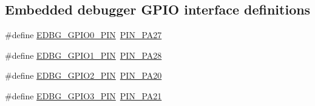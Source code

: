 \subsection*{Embedded debugger G\+P\+IO interface definitions}
\begin{DoxyCompactItemize}
\item 
\#define \mbox{\hyperlink{group__samd21__xplained__pro__features__group_gab52250c9a7d51e3c63694293bf95eb6e}{E\+D\+B\+G\+\_\+\+G\+P\+I\+O0\+\_\+\+P\+IN}}~\mbox{\hyperlink{pio_2samd21j18a_8h_a3794cc9242203d349103ba1249e5d587}{P\+I\+N\+\_\+\+P\+A27}}
\item 
\#define \mbox{\hyperlink{group__samd21__xplained__pro__features__group_ga3c61dc36b629d98962cdc489d7631607}{E\+D\+B\+G\+\_\+\+G\+P\+I\+O1\+\_\+\+P\+IN}}~\mbox{\hyperlink{pio_2samd21j18a_8h_af75c65abdba3e908699ed3c1c21f1148}{P\+I\+N\+\_\+\+P\+A28}}
\item 
\#define \mbox{\hyperlink{group__samd21__xplained__pro__features__group_gafbf7f6c9548bd68ba68ab103a7bdb2dd}{E\+D\+B\+G\+\_\+\+G\+P\+I\+O2\+\_\+\+P\+IN}}~\mbox{\hyperlink{pio_2samd21j18a_8h_a00c77a5c19a99cee2402fc83b04c02d5}{P\+I\+N\+\_\+\+P\+A20}}
\item 
\#define \mbox{\hyperlink{group__samd21__xplained__pro__features__group_ga8fe4ed875b8b06710da5cc565ae524ba}{E\+D\+B\+G\+\_\+\+G\+P\+I\+O3\+\_\+\+P\+IN}}~\mbox{\hyperlink{pio_2samd21j18a_8h_af985624239bfbec119533432376256b8}{P\+I\+N\+\_\+\+P\+A21}}
\end{DoxyCompactItemize}
